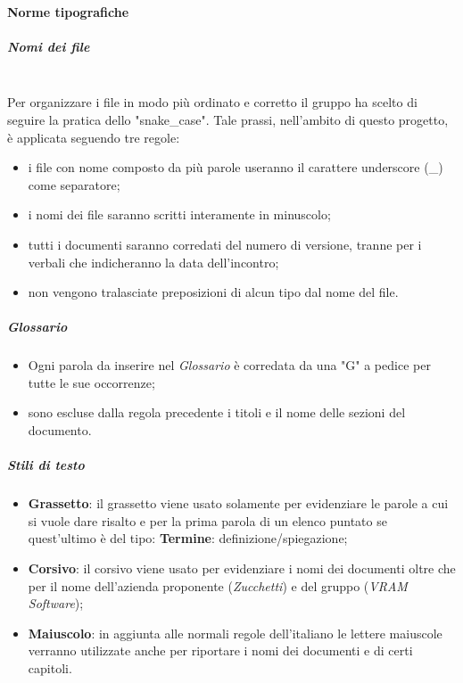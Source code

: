         \paragraph{Norme tipografiche}
                \subparagraph{Nomi dei file}\mbox{}\\ [1mm]
                    Per organizzare i file in modo più ordinato e corretto il gruppo ha scelto di seguire la pratica dello "snake\_case"\glo.
                    Tale prassi, nell'ambito di questo progetto\glo, è applicata seguendo tre regole:
                    \begin{itemize}
                        \item i file con nome composto da più parole useranno il carattere underscore (\_) come separatore;
                        \item i nomi dei file saranno scritti interamente in minuscolo;
                        \item tutti i documenti saranno corredati del numero di versione, tranne per i verbali che indicheranno la data dell'incontro;
                        \item non vengono tralasciate preposizioni di alcun tipo dal nome del file.
                    \end{itemize}
                \subparagraph{Glossario}
                    \begin{itemize}
                        \item Ogni parola da inserire nel \textit{Glossario} è corredata da una "G" a pedice per tutte le sue occorrenze;
                        \item sono escluse dalla regola precedente i titoli e il nome delle sezioni del documento.
                    \end{itemize}
                \subparagraph{Stili di testo}
                \begin{itemize}
                    \item \textbf{Grassetto}: il grassetto viene usato solamente per evidenziare le parole a cui si vuole dare risalto e per la prima parola
                                              di un elenco puntato se quest'ultimo è del tipo: \textbf{Termine}: definizione/spiegazione;
                    \item \textbf{Corsivo}: il corsivo viene usato per evidenziare i nomi dei documenti oltre che per il nome dell'azienda
                                            proponente (\textit{Zucchetti}) e del gruppo (\textit{VRAM Software});
                    \item \textbf{Maiuscolo}: in aggiunta alle normali regole dell'italiano le lettere maiuscole verranno utilizzate anche per riportare i nomi dei
                                              documenti e di certi capitoli.
                \end{itemize}
